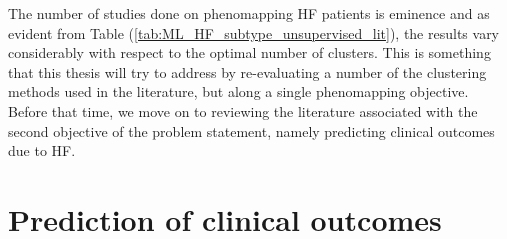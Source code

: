 \documentclass[../thesis.tex]{subfiles}
\begin{document}
\indent The number of studies done on phenomapping HF patients is eminence and as evident from Table (\ref{tab:ML_HF_subtype_unsupervised_lit}), the results vary considerably with respect to the optimal number of clusters. This is something that this thesis will try to address by re-evaluating a number of the clustering methods used in the literature, but along a single phenomapping objective. Before that time, we move on to reviewing the literature associated with the second objective of the problem statement, namely predicting clinical outcomes due to HF.

\section{Prediction of clinical outcomes}
\label{sec:predclincout}
\end{document}
